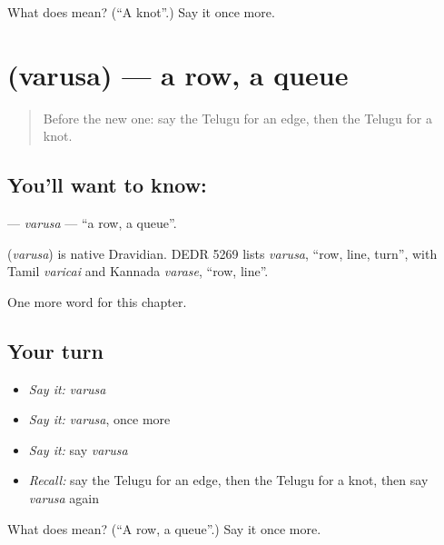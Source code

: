 \begin{tcolorbox}[breakable,colback=teal!4,colframe=teal!35!black,title={Before you move on}]
What does  mean? (\textquotedblleft{}A knot\textquotedblright{}.) Say it once more.
\end{tcolorbox}
\section[\texorpdfstring{\te{వరుస} (varusa)}{వరుస (varusa)}]{ (varusa) — a row, a queue}

\label{lesson:TE-C308-varusa}



\begin{quote}
Before the new one: say the Telugu for an edge, then the Telugu for a knot.
\end{quote}

\subsection*{You'll want to know: }
\textbf{} — \emph{varusa} — \textquotedblleft{}a row, a queue\textquotedblright{}.

\begin{cousinweb}
\textbf{} (\emph{varusa}) is native Dravidian. DEDR 5269 lists \emph{varusa}, \textquotedblleft{}row, line, turn\textquotedblright{}, with Tamil \emph{varicai} and Kannada \emph{varase}, \textquotedblleft{}row, line\textquotedblright{}.
\end{cousinweb}

\begin{grammarlens}[title={What you've built}]
One more word for this chapter.
\end{grammarlens}

\subsection*{Your turn}
\begin{itemize}
\raggedright
  \item \emph{Say it:} \emph{varusa}
  \item \emph{Say it:} \emph{varusa}, once more
  \item \emph{Say it:} say \emph{varusa}
  \item \emph{Recall:} say the Telugu for an edge, then the Telugu for a knot, then say \emph{varusa} again
\end{itemize}

\begin{tcolorbox}[breakable,colback=teal!4,colframe=teal!35!black,title={Before you move on}]
What does  mean? (\textquotedblleft{}A row, a queue\textquotedblright{}.) Say it once more.
\end{tcolorbox}
